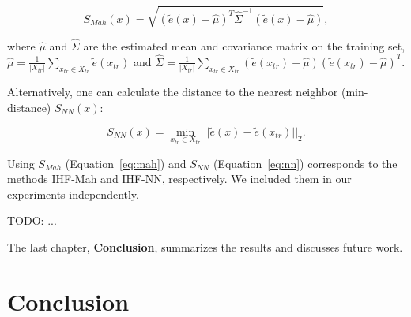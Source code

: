 \begin{equation}
	\label{eq:mah}
	S_{Mah}(x) = \sqrt{ \left( \tilde{e}(x) - \hat{\mu} \right)^T \hat{\Sigma}^{-1} \left( \tilde{e}(x) - \hat{\mu} \right) },
\end{equation}

\noindent
where $\hat{\mu}$ and $\hat{\Sigma}$ are the estimated mean and covariance matrix on the training set, $\hat{\mu} = \frac{1}{|X_{tr}|} \sum_{x_{tr} \in X_{tr}} \tilde{e} \left(x_{tr}\right)$ and $\hat{\Sigma} = \frac{1}{|X_{tr}|} \sum_{x_{tr} \in X_{tr}} \left( \tilde{e} (x_{tr}) - \hat{\mu} \right) \left( \tilde{e} (x_{tr}) - \hat{\mu} \right)^T$.

Alternatively, one can calculate the distance to the nearest neighbor (min-distance) $S_{NN}(x)$:

\begin{equation}
	\label{eq:nn}
	S_{NN}(x) = \min_{x_{tr} \in X_{tr}} || \tilde{e} (x) - \tilde{e} (x_{tr}) ||_2.
\end{equation}

Using $S_{Mah}$ (Equation~\ref{eq:mah}) and $S_{NN}$ (Equation~\ref{eq:nn}) corresponds to the methods IHF-Mah and IHF-NN, respectively. We included them in our experiments independently.

TODO: ...



The last chapter, \textbf{Conclusion}, summarizes the results and discusses future work.


\section*{Conclusion}


